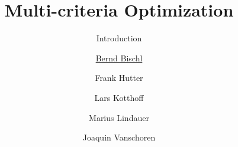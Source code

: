 

\newcommand{\xx}{\conf} %
\newcommand{\xxi}[1][i]{\lambda_{#1}} %
\newcommand{\XX}{\pcs} %
\newcommand{\f}{\cost} %
\newcommand{\yy}{\cost} %

\title[AutoML: Overview]{Multi-criteria Optimization}
\subtitle{Introduction}
\author[Bernd Bischl]{\underline{Bernd Bischl} \and Frank Hutter \and Lars Kotthoff\newline \and Marius Lindauer \and Joaquin Vanschoren}
\institute{}
\date{}






	\maketitle



